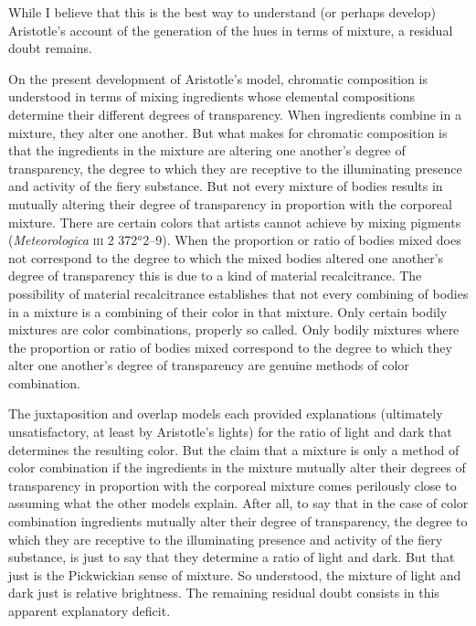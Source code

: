 While I believe that this is the best way to understand (or perhaps develop) Aristotle's account of the generation of the hues in terms of mixture, a residual doubt remains. 

On the present development of Aristotle's model, chromatic composition is understood in terms of mixing ingredients whose elemental compositions determine their different degrees of transparency. When ingredients combine in a mixture, they alter one another. But what makes for chromatic composition is that the ingredients in the mixture are altering one another's degree of transparency, the degree to which they are receptive to the illuminating presence and activity of the fiery substance. But not every mixture of bodies results in mutually altering their degree of transparency in proportion with the corporeal mixture. There are certain colors that artists cannot achieve by mixing pigments (\emph{Meteorologica} \textsc{iii} 2 372\( ^{a} \)2--9). When the proportion or ratio of bodies mixed does not correspond to the degree to which the mixed bodies altered one another's degree of transparency this is due to a kind of material recalcitrance. The possibility of material recalcitrance establishes that not every combining of bodies in a mixture is a combining of their color in that mixture. Only certain bodily mixtures are color combinations, properly so called. Only bodily mixtures where the proportion or ratio of bodies mixed correspond to the degree to which they alter one another's degree of transparency are genuine methods of color combination.

The juxtaposition and overlap models each provided explanations (ultimately unsatisfactory, at least by Aristotle's lights) for the ratio of light and dark that determines the resulting color. But the claim that a mixture is only a method of color combination if the ingredients in the mixture mutually alter their degrees of transparency in proportion with the corporeal mixture comes perilously close to assuming what the other models explain. After all, to say that in the case of color combination ingredients mutually alter their degree of transparency, the degree to which they are receptive to the illuminating presence and activity of the fiery substance, is just to say that they determine a ratio of light and dark. But that just is the Pickwickian sense of mixture. So understood, the mixture of light and dark just is relative brightness. The remaining residual doubt consists in this apparent explanatory deficit. 

